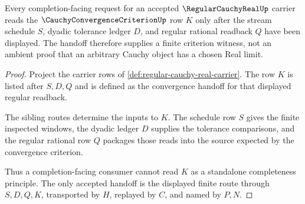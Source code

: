\begin{theorem}
\label{thm:regular-cauchy-real-cauchy-criterion-handoff}
Every completion-facing request for an accepted $\RegularCauchyRealUp$ carrier reads the $\CauchyConvergenceCriterionUp$ row $K$ only after the stream schedule $S$, dyadic tolerance ledger $D$, and regular rational readback $Q$ have been displayed. The handoff therefore supplies a finite criterion witness, not an ambient proof that an arbitrary Cauchy object has a chosen Real limit.
\end{theorem}
\begin{proof}
Project the carrier rows of \autoref{def:regular-cauchy-real-carrier}. The row $K$ is listed after $S,D,Q$ and is defined as the convergence handoff for that displayed regular readback.

The sibling routes determine the inputs to $K$. The schedule row $S$ gives the finite inspected windows, the dyadic ledger $D$ supplies the tolerance comparisons, and the regular rational row $Q$ packages those reads into the source expected by the convergence criterion.

Thus a completion-facing consumer cannot read $K$ as a standalone completeness principle. The only accepted handoff is the displayed finite route through $S,D,Q,K$, transported by $H$, replayed by $C$, and named by $P,N$.
\end{proof}

